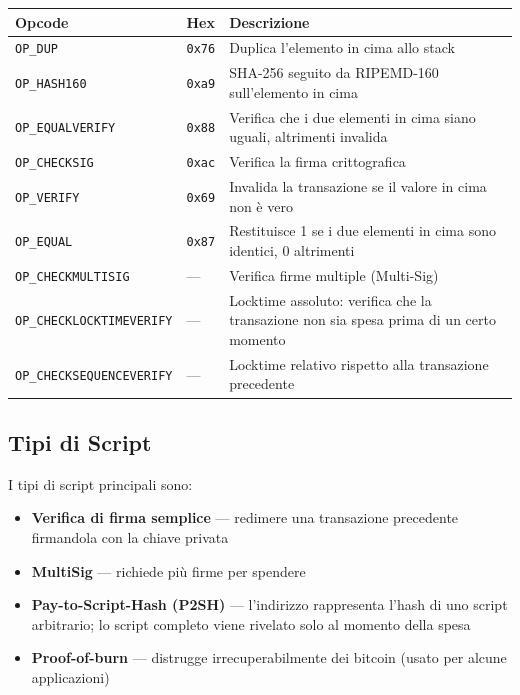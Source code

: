 \documentclass[
  italian,
  openany]{book}
\newcounter{none} %
\providecommand{\tightlist}{%
  \setlength{\itemsep}{0pt}\setlength{\parskip}{0pt}}
\begin{document}
{\def\LTcaptype{none} %
\begin{longtable}[]{@{}
  >{\raggedright\arraybackslash}p{}
  >{\raggedright\arraybackslash}p{}
  >{\raggedright\arraybackslash}p{}@{}}
\toprule\noalign{}
\begin{minipage}[b]{\linewidth}\raggedright
Opcode
\end{minipage} & \begin{minipage}[b]{\linewidth}\raggedright
Hex
\end{minipage} & \begin{minipage}[b]{\linewidth}\raggedright
Descrizione
\end{minipage} \\
\midrule\noalign{}
\endhead
\bottomrule\noalign{}
\endlastfoot
\texttt{OP\_DUP} & \texttt{0x76} & Duplica l'elemento in cima allo
stack \\
\texttt{OP\_HASH160} & \texttt{0xa9} & SHA-256 seguito da RIPEMD-160
sull'elemento in cima \\
\texttt{OP\_EQUALVERIFY} & \texttt{0x88} & Verifica che i due elementi
in cima siano uguali, altrimenti invalida \\
\texttt{OP\_CHECKSIG} & \texttt{0xac} & Verifica la firma
crittografica \\
\texttt{OP\_VERIFY} & \texttt{0x69} & Invalida la transazione se il
valore in cima non è vero \\
\texttt{OP\_EQUAL} & \texttt{0x87} & Restituisce 1 se i due elementi in
cima sono identici, 0 altrimenti \\
\texttt{OP\_CHECKMULTISIG} & --- & Verifica firme multiple
(Multi-Sig) \\
\texttt{OP\_CHECKLOCKTIMEVERIFY} & --- & Locktime assoluto: verifica che
la transazione non sia spesa prima di un certo momento \\
\texttt{OP\_CHECKSEQUENCEVERIFY} & --- & Locktime relativo rispetto alla
transazione precedente \\
\end{longtable}
}

\subsection{Tipi di Script}\label{tipi-di-script}

I tipi di script principali sono:

\begin{itemize}
\tightlist
\item
  \textbf{Verifica di firma semplice} --- redimere una transazione
  precedente firmandola con la chiave privata
\item
  \textbf{MultiSig} --- richiede più firme per spendere
\item
  \textbf{Pay-to-Script-Hash (P2SH)} --- l'indirizzo rappresenta l'hash
  di uno script arbitrario; lo script completo viene rivelato solo al
  momento della spesa
\item
  \textbf{Proof-of-burn} --- distrugge irrecuperabilmente dei bitcoin
  (usato per alcune applicazioni)
\end{itemize}
\end{document}
